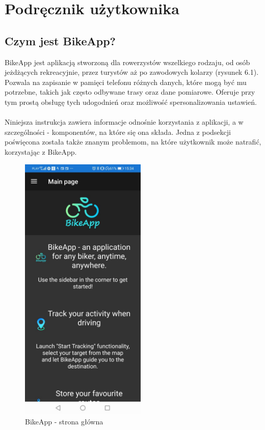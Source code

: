 	\newpage
\section{Podręcznik użytkownika}  %

\subsection{Czym jest BikeApp?} %

BikeApp jest aplikacją stworzoną dla rowerzystów wszelkiego rodzaju, od osób jeżdżących rekreacyjnie, przez turystów aż po zawodowych kolarzy (rysunek 6.1). Pozwala na zapisanie w pamięci telefonu różnych danych, które mogą być mu potrzebne, takich jak często odbywane trasy oraz dane pomiarowe. Oferuje przy tym prostą obsługę tych udogodnień oraz możliwość spersonalizowania ustawień.\\
\\
Niniejsza instrukcja zawiera informacje odnośnie korzystania z aplikacji, a w szczególności - komponentów, na które się ona składa. Jedna z podsekcji poświęcona została także znanym problemom, na które użytkownik może natrafić, korzystając z BikeApp.\\

\begin{figure}[!htb]
	\begin{center}
		\includegraphics[width=6cm]{rys/instructions-mainpage.jpg}
		\caption{BikeApp - strona główna}
		\label{rys:BikeApp - strona główna}
	\end{center}
\end{figure}


